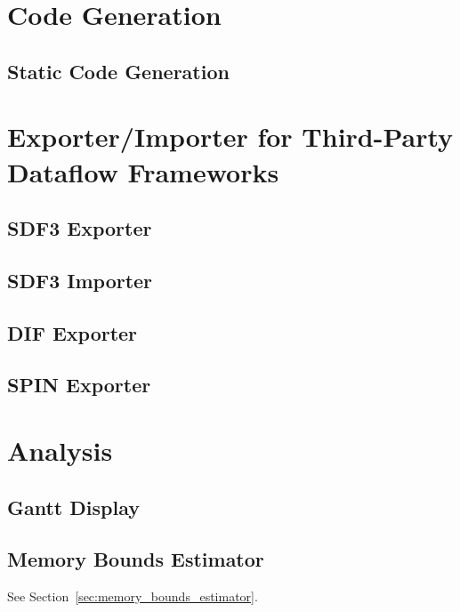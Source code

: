 \documentclass[10pt,letterpaper]{report}
\begin{document}
	\section{Code Generation}
	\subsection{Static Code Generation}
	
	\section{Exporter/Importer for Third-Party Dataflow Frameworks}
	\subsection{SDF3 Exporter}
	\subsection{SDF3 Importer}
	\subsection{DIF Exporter}
	\subsection{SPIN Exporter}
	
	\section{Analysis}
	\subsection{Gantt Display}
	\subsection{Memory Bounds Estimator}
	See Section~\ref{sec:memory_bounds_estimator}.
\end{document}
